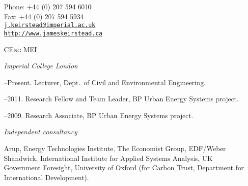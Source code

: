 \documentclass[11pt,a4paper]{article}
\makeatletter
\def\myemail{j.keirstead@imperial.ac.uk}
\def\myweb{http://www.jameskeirstead.ca}
\def\myphone{+44 (0) 207 594 6010}
\def\myfax{+44 (0) 207 594 5934}
\makeatother
\begin{document}
\thispagestyle{frontpage}

\begin{minipage}[t]{3.95in}
\end{minipage}
\hfill     
\begin{minipage}[t]{1.5in}
  \flushright \footnotesize Phone: \myphone \\ 
  Fax: \myfax  \\ 
  {\scriptsize  \texttt{\href{mailto:\myemail}{\myemail}}} \\
  {\scriptsize  \texttt{\href{\myweb}{\myweb}}}
\end{minipage}

\bigskip

\bigskip

 {\scriptsize \textsc{CEng MEI}}
\reversemarginpar
\raggedright

\bigskip

\bigskip


\noindent{}%
%
\emph{Imperial College London \vspace{0.01in}}

--Present. Lecturer, Dept.\ of Civil and Environmental Engineering.      

--2011. Research Fellow and Team Leader, BP Urban Energy Systems project.

--2009. Research Associate, BP Urban Energy Systems project. \vspace{0.02in}

\medskip
\emph{Independent consultancy\vspace{0.01in}}

\ind Arup, Energy Technologies Institute, The Economist Group, EDF/Weber Shandwick, International Institute for Applied Systems Analysis, UK Government Foresight, University of Oxford (for Carbon Trust, Department for International Development).
\end{document}
